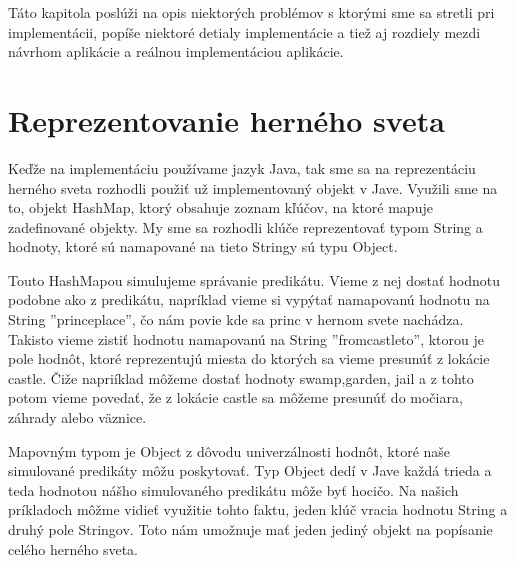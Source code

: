 Táto kapitola poslúži na opis niektorých problémov s ktorými sme sa stretli pri implementácii, popíše niektoré detialy implementácie a tiež aj rozdiely mezdi návrhom aplikácie a reálnou implementáciou aplikácie.
\section{Reprezentovanie herného sveta}
Keďže na implementáciu používame jazyk Java, tak sme sa na reprezentáciu herného sveta rozhodli použiť už implementovaný objekt v Jave. Využili sme na to, objekt HashMap, ktorý obsahuje zoznam kľúčov, na ktoré mapuje zadefinované objekty. My sme sa rozhodli klúče reprezentovať typom String a hodnoty, ktoré sú namapované na tieto Stringy sú typu Object.\par
Touto HashMapou simulujeme správanie predikátu. Vieme z nej dostať hodnotu podobne ako z predikátu, napríklad vieme si vypýtať namapovanú hodnotu na String ''princeplace'', čo nám povie kde sa princ v hernom svete nachádza. Takisto vieme zistiť hodnotu namapovanú na String ''fromcastleto'', ktorou je pole hodnôt, ktoré reprezentujú miesta do ktorých sa vieme presunúť z lokácie castle. Čiže napriíklad môžeme dostať hodnoty swamp,garden, jail a z tohto potom vieme povedať, že z lokácie castle sa môžeme presunúť do močiara, záhrady alebo väznice.\par
Mapovným typom je Object z dôvodu univerzálnosti hodnôt, ktoré naše simulované predikáty môžu poskytovať. Typ Object dedí v Jave každá trieda a teda hodnotou nášho simulovaného predikátu môže byť hocičo. Na našich príkladoch môžme vidieť využitie tohto faktu, jeden klúč vracia hodnotu String a druhý pole Stringov. Toto nám umožnuje mať jeden jediný objekt na popísanie celého herného sveta.
